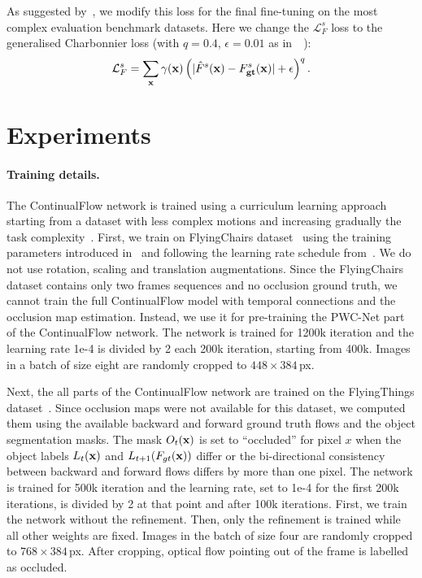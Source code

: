 \documentclass[runningheads]{llncs}
\begin{document}
As suggested by~\cite{Sun2017}, we modify this loss for the final fine-tuning on the most complex evaluation benchmark datasets. Here we change the $\mathcal{L}^s_F$ loss to the generalised Charbonnier loss (with $q=0.4$, $\epsilon=0.01$ as in~~\cite{Sun2017}):
\begin{equation}
\mathcal{L}^s_F = \sum_{\bf x} \gamma({\bf x}) \left( | \hat{F}^s({\bf x}) - F_{\bf gt}^s({\bf x}) | + \epsilon \right)^{q}.
\end{equation}
 
\section{Experiments}
\label{sec:experiments}
\paragraph{\bf{Training details.}}
The ContinualFlow network is trained using a curriculum learning approach~\cite{Bengio2009} starting from a dataset with less complex motions and increasing gradually the task complexity~\cite{Ilg2016,Sun2017}.
First, we train on FlyingChairs dataset~\cite{Dosovitskiy2015} using the training parameters introduced in~\cite{Sun2017} and following the learning rate schedule from~\cite{Ilg2016}.
We do not use rotation, scaling and translation augmentations.
Since the FlyingChairs dataset contains only two frames sequences and no occlusion ground truth, we cannot train the full ContinualFlow model with temporal connections and the occlusion map estimation.
Instead, we use it for pre-training the PWC-Net part of the ContinualFlow network. 
The network is trained for 1200k iteration and the learning rate 1e-4 is divided by 2 each 200k iteration, starting from 400k.
Images in a batch of size eight are randomly cropped to $448\times 384$\,px.

Next, the all parts of the ContinualFlow network are trained on the FlyingThings dataset~\cite{Mayer2016}.
Since occlusion maps were not available for this dataset, we computed them using the available backward and forward ground truth flows and the object segmentation masks.
The mask $O_t({\bf x})$ is set to ``occluded'' for  pixel $x$ when the object labels $L_t({\bf x})$ and $L_{t+1}(F_{gt}({\bf x}))$ differ or the bi-directional consistency between backward and forward flows differs by more than one pixel.
The network is trained for 500k iteration and the learning rate, set to 1e-4 for the first 200k iterations, is divided by 2 at that point and after 100k iterations.
First, we train the network without the refinement.
Then, only the refinement is trained while all other weights are fixed.
Images in the batch of size four are randomly cropped to $768\times 384$\,px.
After cropping, optical flow pointing out of the frame is labelled as occluded.
\end{document}
